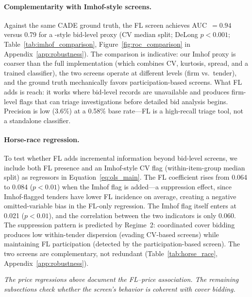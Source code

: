 \paragraph{Complementarity with Imhof-style screens.}
Against the same CADE ground truth, the FL screen achieves
AUC~$= 0.94$ versus 0.79 for a \citet{imhof2019detecting}-style
bid-level proxy (CV median split; DeLong $p < 0.001$;
Table~\ref{tab:imhof_comparison},
Figure~\ref{fig:roc_comparison} in Appendix~\ref{app:robustness}).
The comparison is indicative: our Imhof proxy is coarser than the
full implementation (which combines CV, kurtosis, spread, and a
trained classifier), the two screens operate at different levels
(firm vs.\ tender), and the ground truth mechanically favors
participation-based screens. What FL adds is reach: it works where
bid-level records are unavailable and produces firm-level flags that
can triage investigations before detailed bid analysis begins.
Precision is low (3.6\%) at a 0.58\% base rate---FL is a
high-recall triage tool, not a standalone classifier.

\paragraph{Horse-race regression.}
To test whether FL adds incremental information beyond bid-level
screens, we include both FL presence and an Imhof-style CV flag
(within-item-group median split) as regressors in
Equation~\eqref{eq:ols_main}. The FL coefficient rises from 0.064 to 0.084
($p < 0.01$) when the Imhof flag is added---a suppression effect,
since Imhof-flagged tenders have lower FL incidence on average,
creating a negative omitted-variable bias in the FL-only regression.
The Imhof flag itself enters at 0.021 ($p < 0.01$), and the
correlation between the two indicators is only 0.060. The suppression
pattern is predicted by Regime~2: coordinated cover bidding produces
low within-tender dispersion (evading CV-based screens) while
maintaining FL participation (detected by the participation-based
screen). The two screens are complementary, not redundant
(Table~\ref{tab:horse_race}, Appendix~\ref{app:robustness}).




\medskip
\noindent\textit{The price regressions above document the FL--price
association. The remaining subsections check whether the screen's
behavior is coherent with cover bidding.}
\medskip

